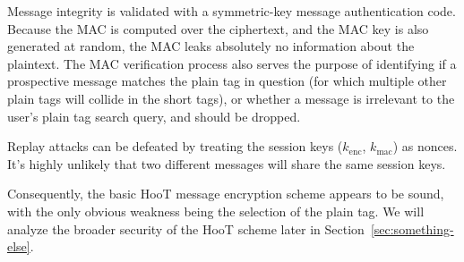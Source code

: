 Message integrity is validated with a symmetric-key message authentication code. Because the MAC is computed over the ciphertext, and the MAC key is also generated at random, the MAC leaks absolutely no information about the plaintext. The MAC verification process also serves the purpose of identifying if a prospective message matches the plain tag in question (for which multiple other plain tags will collide in the short tags), or whether a message is irrelevant to the user's plain tag search query, and should be dropped.

Replay attacks can be defeated by treating the session keys ($k_{\mathrm{enc}}$, $k_{\mathrm{mac}}$) as nonces. It's highly unlikely that two different messages will share the same session keys.

Consequently, the basic HooT message encryption scheme appears to be sound, with the only obvious weakness being the selection of the plain tag. We will analyze the broader security of the HooT scheme later in Section~\ref{sec:something-else}.
